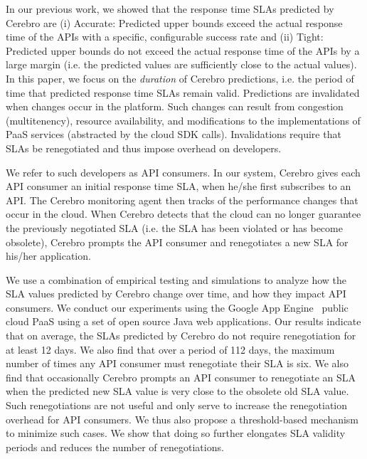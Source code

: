 In our previous work, we showed that the response time SLAs predicted by Cerebro are
(i) Accurate: Predicted upper bounds exceed the actual response time of the APIs
with a specific, configurable success rate and (ii)
Tight: Predicted upper bounds do not exceed the actual response time of the APIs by
a large margin (i.e. the predicted values are sufficiently close to the actual values). 
In this paper, we focus on the \textit{duration} of Cerebro predictions, i.e. the period
of time that predicted response time SLAs remain valid.  Predictions are invalidated
when changes occur in the platform.  Such changes can result from
congestion (multitenency), resource availability, and modifications to the implementations
of PaaS services (abstracted by the cloud SDK calls). Invalidations require that 
SLAs be renegotiated and thus impose overhead on developers.  

We refer to such developers as API consumers.  In our system, Cerebro
gives each API consumer an initial response
time SLA, when he/she first subscribes to an API. The Cerebro monitoring agent 
then tracks of the performance changes that occur in the cloud. When Cerebro detects that the 
cloud can no longer guarantee the previously negotiated SLA (i.e. the SLA has been
violated or has become obsolete), Cerebro prompts the API consumer and renegotiates a new
SLA for his/her application.

We use a combination of empirical testing and simulations to analyze how the SLA values
predicted by Cerebro change over time, and how they impact API consumers. We
conduct our experiments using the Google App Engine~\cite{gae} public cloud PaaS 
using a set of open source Java web applications. Our results indicate that on average, the
SLAs predicted by Cerebro do not require renegotiation for at least 12 days. We also find that
over a period of 112 days, the maximum number of times any API consumer must renegotiate
their SLA is six.
We also find that occasionally Cerebro prompts an API consumer to
renegotiate an SLA when the predicted new SLA value is very close to the obsolete old SLA value. 
Such renegotiations are not useful and only serve to increase the renegotiation overhead
for API consumers. We thus also
propose a threshold-based mechanism to minimize such cases.  We show that doing so
further elongates SLA validity periods and reduces the number of renegotiations.
